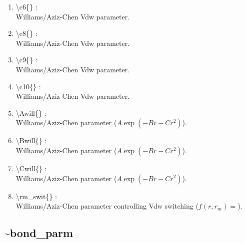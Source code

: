 \documentclass[12pt,titlepage]{article}
\begin{document}
\begin{enumerate}
 \vspace{0.15in} 
 \item  \textbackslash c6\{\} : \\ 
    Williams/Aziz-Chen Vdw parameter.

 \vspace{0.15in} 
 \item  \textbackslash c8\{\} : \\ 
    Williams/Aziz-Chen Vdw parameter.

 \vspace{0.15in} 
 \item  \textbackslash c9\{\} : \\ 
    Williams/Aziz-Chen Vdw parameter.

 \vspace{0.15in} 
 \item  \textbackslash c10\{\} : \\ 
    Williams/Aziz-Chen Vdw parameter.

 \vspace{0.15in} 
 \item  \textbackslash Awill\{\} : \\ 
    Williams/Aziz-Chen parameter ($A\exp(-Br-Cr^2)$).

 \vspace{0.15in} 
 \item  \textbackslash Bwill\{\} : \\ 
    Williams/Aziz-Chen parameter ($A\exp(-Br-Cr^2)$).

 \vspace{0.15in} 
 \item  \textbackslash Cwill\{\} : \\ 
    Williams/Aziz-Chen parameter ($A\exp(-Br-Cr^2)$).

 \vspace{0.15in} 
 \item  \textbackslash rm\_swit\{\} : \\ 
    Williams/Aziz-Chen parameter controlling Vdw switching 
   ($f(r,r_m) = $).

\end{enumerate}

\newpage
\subsection*{\bf \~{}bond\_parm}
\end{document}
